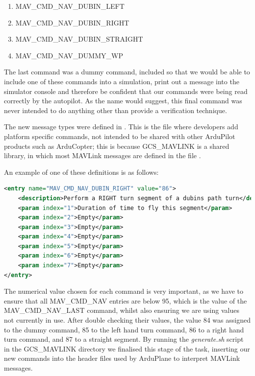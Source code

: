  \begin{enumerate}
 	\item MAV\_CMD\_NAV\_DUBIN\_LEFT
 	\item MAV\_CMD\_NAV\_DUBIN\_RIGHT
 	\item MAV\_CMD\_NAV\_DUBIN\_STRAIGHT
 	\item MAV\_CMD\_NAV\_DUMMY\_WP
 \end{enumerate}

 The last command was a dummy command, included so that we would be able to include one of these commands into a simulation, print out a message into the simulator console and therefore be confident that our commands were being read correctly by the autopilot. As the name would suggest, this final command was never intended to do anything other than provide a verification technique.

 The new message types were defined in . This is the file where developers add platform specific commands, not intended to be shared with other ArduPilot products such as ArduCopter; this is because GCS\_MAVLINK is a shared library, in which most MAVLink messages are defined in the file .

 An example of one of these definitions is as follows:

 \begin{minipage}{\linewidth}
\begin{lstlisting}[language=XML]
<entry name="MAV_CMD_NAV_DUBIN_RIGHT" value="86">
	<description>Perform a RIGHT turn segment of a dubins path turn</description>
	<param index="1">Duration of time to fly this segment</param>
	<param index="2">Empty</param>
	<param index="3">Empty</param>
	<param index="4">Empty</param>
	<param index="5">Empty</param>
	<param index="6">Empty</param>
	<param index="7">Empty</param>
</entry>
\end{lstlisting}
\end{minipage}

The numerical value chosen for each command is very important, as we have to ensure that all MAV\_CMD\_NAV entries are below 95, which is the value of the MAV\_CMD\_NAV\_LAST command, whilst also ensuring we are using values not currently in use. After double checking their values, the value 84 was assigned to the dummy command, 85 to the left hand turn command, 86 to a right hand turn command, and 87 to a straight segment. By running the \textit{generate.sh} script in the GCS\_MAVLINK directory we finalised this stage of the task, inserting our new commands into the header files used by ArduPlane to interpret MAVLink messages.


